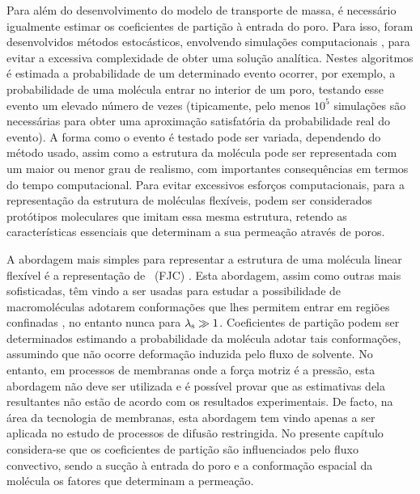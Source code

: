%
Para além do desenvolvimento do modelo de transporte de massa, é necessário igualmente estimar os coeficientes de partição à entrada do poro. Para isso, foram desenvolvidos métodos estocásticos, envolvendo simulações computacionais \cite{davidson87,hermsen,cifra}, para evitar a excessiva complexidade de obter uma solução analítica. Nestes algoritmos é estimada a probabilidade de um determinado evento ocorrer, por exemplo, a probabilidade de uma molécula entrar no interior de um poro, testando esse evento um elevado número de vezes (tipicamente, pelo menos $10^{5}$ simulações são necessárias para obter uma aproximação satisfatória da probabilidade real do evento). A forma como o evento é testado pode ser variada, dependendo do método usado, assim como a estrutura da molécula pode ser representada com um maior ou menor grau de realismo, com importantes consequências em termos do tempo computacional. Para evitar excessivos esforços computacionais, para a representação da estrutura de moléculas flexíveis, podem ser considerados protótipos moleculares que imitam essa mesma estrutura, retendo as características essenciais que determinam a sua permeação através de poros.

%
A abordagem mais simples para representar a estrutura de uma molécula linear flexível é a representação de \fjc\ (FJC) \cite{teraoka,youngbook,tager}. Esta abordagem, assim como outras mais sofisticadas, têm vindo a ser usadas para estudar a possibilidade de macromoléculas adotarem conformações que lhes permitem entrar em regiões confinadas \cite{davidson87,hermsen,cifra}, no entanto nunca para $\lambda_{\mathrm{s}} \gg 1$. Coeficientes de partição podem ser determinados estimando a probabilidade da molécula adotar tais conformações, assumindo que não ocorre deformação induzida pelo fluxo de solvente. No entanto, em processos de membranas onde a força motriz é a pressão, esta abordagem não deve ser utilizada e é possível provar que as estimativas dela resultantes não estão de acordo com os resultados experimentais. De facto, na área da tecnologia de membranas, esta abordagem tem vindo apenas a ser aplicada no estudo de processos de difusão restringida. No presente capítulo considera-se que os coeficientes de partição são influenciados pelo fluxo convectivo, sendo a sucção à entrada do poro e a conformação espacial da molécula os fatores que determinam a permeação.


